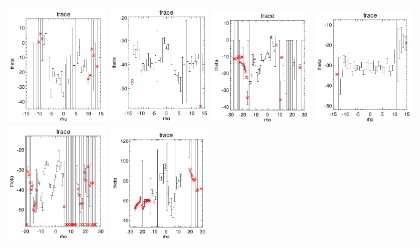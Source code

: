 \documentclass[fleqn,usenatbib]{mnras}
\begin{document}
\begin{figure}
    \includegraphics[width=0.23\textwidth]{Images/trace-plots/trace-plots-cpsb-controls/8602-6101.png}
    \includegraphics[width=0.23\textwidth]{Images/trace-plots/trace-plots-cpsb-controls/8623-3702.png}
    \includegraphics[width=0.23\textwidth]{Images/trace-plots/trace-plots-cpsb-controls/8624-12704.png}
    \includegraphics[width=0.23\textwidth]{Images/trace-plots/trace-plots-cpsb-controls/8625-3703.png}
    \includegraphics[width=0.23\textwidth]{Images/trace-plots/trace-plots-cpsb-controls/8716-12704.png}
    \includegraphics[width=0.23\textwidth]{Images/trace-plots/trace-plots-cpsb-controls/8727-12704.png}

\end{figure}
\end{document}
